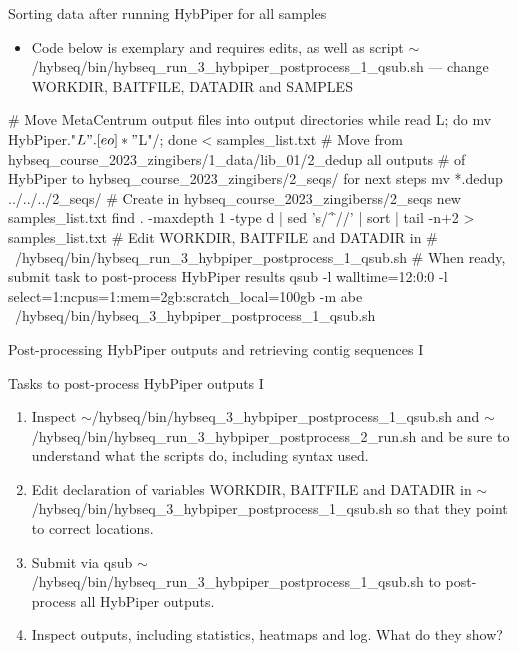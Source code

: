 \documentclass[compress, ucs, xelatex, 11pt, xcolor=x11names, aspectratio=169,
	hyperref={
		bookmarks=true,
		unicode=true,
		colorlinks=true,
		pdftitle={HybSeq course},
		plainpages=false,
		pdfauthor={Vojtech Zeisek},
		pdfsubject={Practical processing of HybSeq target enrichment sequencing data on computing grids like MetaCentrum},
		pdfcreator={XeLaTeX},
		pdfkeywords={BASH, command line, GNU, HybSeq, Linux, MetaCentrum, sequencing shell, target enrichment},
		linkcolor=Turquoise4, %
		anchorcolor=DodgerBlue4, %
		citecolor=DodgerBlue4, %
		filecolor=DodgerBlue4, %
		menucolor=Tan4, %
		urlcolor=DarkOliveGreen4, %
		pdftex},
	url={hyphens, lowtilde} %
	]{beamer}
\renewcommand{\texttt}[1]{\colorbox{Cornsilk2}{{\ttfamily #1}}}
\renewcommand{\alert}[1]{\textcolor{OrangeRed3}{#1}}
\begin{document}
\begin{frame}[fragile]{Sorting data after running HybPiper for all samples}
	\begin{itemize}
		\item \alert{Code below is exemplary and requires edits, as well as script \texttt{$\sim$/hybseq/bin/hybseq\_run\_3\_hybpiper\_postprocess\_1\_qsub.sh} --- change \texttt{WORKDIR}, \texttt{BAITFILE}, \texttt{DATADIR} and \texttt{SAMPLES}}
	\end{itemize}
	\begin{bashcode}
    # Move MetaCentrum output files into output directories
    while read L; do mv HybPiper."$L".[eo]* "$L"/; done < samples_list.txt
    # Move from hybseq_course_2023_zingibers/1_data/lib_01/2_dedup all outputs
    # of HybPiper to hybseq_course_2023_zingibers/2_seqs/ for next steps
    mv *.dedup ../../../2_seqs/
    # Create in hybseq_course_2023_zingiberss/2_seqs new samples_list.txt
    find . -maxdepth 1 -type d | sed 's/^\.\///' | sort | tail -n+2 >
      samples_list.txt
    # Edit WORKDIR, BAITFILE and DATADIR in
    # ~/hybseq/bin/hybseq_run_3_hybpiper_postprocess_1_qsub.sh
    # When ready, submit task to post-process HybPiper results
    qsub -l walltime=12:0:0 -l select=1:ncpus=1:mem=2gb:scratch_local=100gb
       -m abe ~/hybseq/bin/hybseq_3_hybpiper_postprocess_1_qsub.sh
	\end{bashcode}
\end{frame}

\begin{frame}{Post-processing HybPiper outputs and retrieving contig sequences I}
	\begin{exampleblock}{Tasks to post-process HybPiper outputs I}
		\begin{enumerate}
			\item Inspect \texttt{$\sim$/hybseq/bin/hybseq\_3\_hybpiper\_postprocess\_1\_qsub.sh} and \texttt{$\sim$/hybseq/bin/hybseq\_run\_3\_hybpiper\_postprocess\_2\_run.sh} and be sure to understand what the scripts do, including syntax used.
			\item Edit declaration of variables \texttt{WORKDIR}, \texttt{BAITFILE} and \texttt{DATADIR} in \texttt{$\sim$/hybseq/bin/hybseq\_3\_hybpiper\_postprocess\_1\_qsub.sh} so that they point to correct locations.
			\item Submit via \texttt{qsub} \texttt{$\sim$/hybseq/bin/hybseq\_run\_3\_hybpiper\_postprocess\_1\_qsub.sh} to post-process all HybPiper outputs.
			\item Inspect outputs, including statistics, heatmaps and log. What do they show?
		\end{enumerate}
	\end{exampleblock}
\end{frame}
\end{document}
